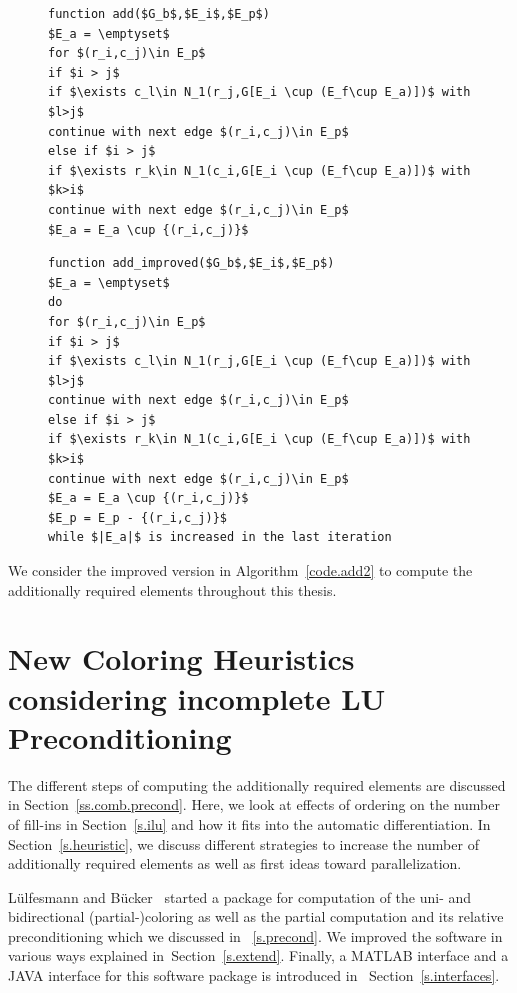 \documentclass[11pt, twoside,a4paper]{book}
\newcommand{\secref}[1]{Section~\protect\ref{#1}}
\newcommand{\coderef}[1]{Algorithm~\protect\ref{#1}}
\begin{document}
\begin{figure}
\begin{lstlisting}[caption=Find additionally required elements,
label=code.add,mathescape]
function add($G_b$,$E_i$,$E_p$)
$E_a = \emptyset$
for $(r_i,c_j)\in E_p$
if $i > j$
if $\exists c_l\in N_1(r_j,G[E_i \cup (E_f\cup E_a)])$ with $l>j$
continue with next edge $(r_i,c_j)\in E_p$
else if $i > j$
if $\exists r_k\in N_1(c_i,G[E_i \cup (E_f\cup E_a)])$ with $k>i$
continue with next edge $(r_i,c_j)\in E_p$
$E_a = E_a \cup {(r_i,c_j)}$
\end{lstlisting}
\end{figure}

\begin{figure}
\begin{lstlisting}[caption=Find additionally required elements (an improved version),
label=code.add2,mathescape]
function add_improved($G_b$,$E_i$,$E_p$)
$E_a = \emptyset$
do
for $(r_i,c_j)\in E_p$
if $i > j$
if $\exists c_l\in N_1(r_j,G[E_i \cup (E_f\cup E_a)])$ with $l>j$
continue with next edge $(r_i,c_j)\in E_p$
else if $i > j$
if $\exists r_k\in N_1(c_i,G[E_i \cup (E_f\cup E_a)])$ with $k>i$
continue with next edge $(r_i,c_j)\in E_p$
$E_a = E_a \cup {(r_i,c_j)}$
$E_p = E_p - {(r_i,c_j)}$
while $|E_a|$ is increased in the last iteration
\end{lstlisting}
\end{figure}
We consider the improved version in \coderef{code.add2}
to compute the additionally required elements
throughout this thesis.
\chapter[New Coloring Heuristics]{New Coloring Heuristics considering incomplete LU Preconditioning}
\label{package}
The different steps of computing the additionally required elements are discussed in
\secref{ss.comb.precond}. Here, we look at effects of ordering on the number of fill-ins
in \secref{s.ilu} and how it fits into the automatic differentiation.
In \secref{s.heuristic}, we discuss different strategies to increase the number of
additionally required elements as well as first ideas toward parallelization.

Lülfesmann and Bücker~\cite{Lulfesmann2012Fap} started a package for computation of the uni-
and bidirectional (partial-)coloring as well as the partial computation and its relative preconditioning
which we discussed in ~\ref{s.precond}.
We improved the software in various ways explained in~\secref{s.extend}.
Finally, a MATLAB interface and a JAVA interface for this software package is introduced
in ~\secref{s.interfaces}.
\end{document}
